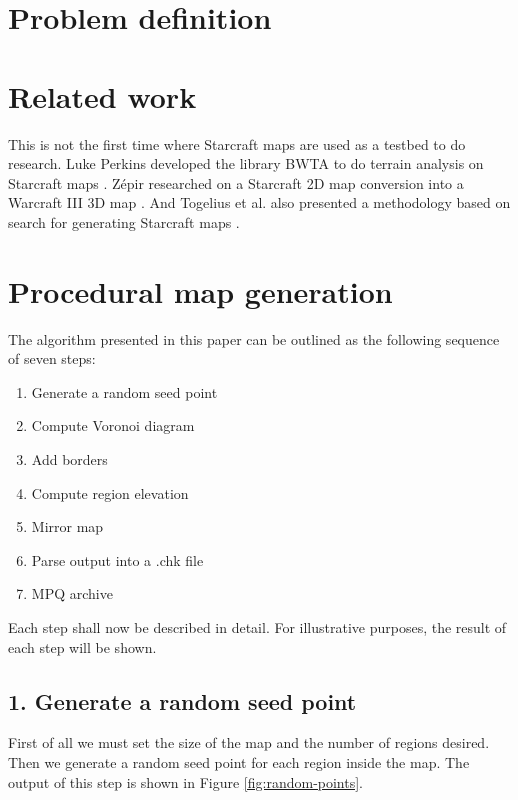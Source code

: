\documentclass[letterpaper]{article}
\begin{document}
\section{Problem definition} %
\label{sec:problem_definition}




\section{Related work} %
\label{sec:related_work}
This is not the first time where Starcraft maps are used as a testbed to do research. Luke Perkins developed the library BWTA to do terrain analysis on Starcraft maps \cite{Perkins10}. Z\'{e}pir researched on a Starcraft 2D map conversion into a Warcraft III 3D map \cite{Zepir}. And Togelius et al. also presented a methodology based on search for generating Starcraft maps \cite{Togelius10}.


\section{Procedural map generation} %
\label{sec:procedural_map_generation}
The algorithm presented in this paper can be outlined as the following sequence of seven steps:
\begin{enumerate}
	\item Generate a random seed point
	\item Compute Voronoi diagram
	\item Add borders
	\item Compute region elevation
	\item Mirror map
	\item Parse output into a .chk file
	\item MPQ archive
\end{enumerate}
Each step shall now be described in detail. For illustrative purposes, the result of each step will be shown.

\subsection{1. Generate a random seed point}
First of all we must set the size of the map and the number of regions desired. Then we generate a random seed point for each region inside the map. The output of this step is shown in Figure \ref{fig:random-points}.
\end{document}
